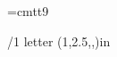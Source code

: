 
\font\ninett=cmtt9




\def\StarbuckGreen{\setcmykcolor{1.0 0 0.5 0.6}}

\fixmnotes\right \mnotesize=1.7in \def\mnotehook{\typosize[8/10]\it}
\mnoteindent=20pt
\margins/1 letter (1,2.5,,)in

\hyperlinks \Green \Blue %

\def\tthook{\typosize[9/11]}  %

%
%
\def\date#1{\vskip10pt \noindent{\bf #1}\hfill\vskip 5pt
  \everypar={{\setbox0\lastbox}\everypar={}}}

%
\def\symbol{\begingroup\catcode`\_=12\relax\symbolimpl}
\def\symbolimpl#1{{\ninett #1}\endgroup}
